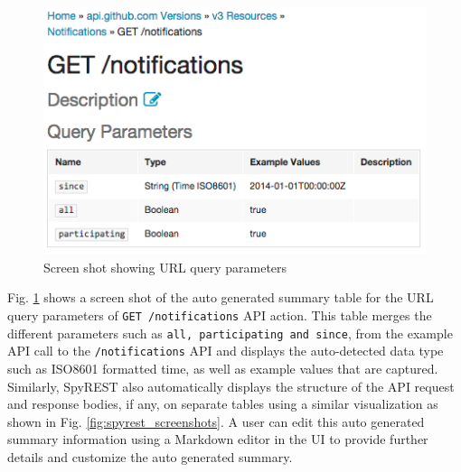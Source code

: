 \documentclass[conference]{IEEEtran}
\begin{document}
\begin{figure}[!tbh]
  \centering
  \includegraphics[width=\linewidth]{notifications_query.png}
  \caption{Screen shot showing URL query parameters}
  \label{fig:notifications_query}
\end{figure}

Fig. \ref{fig:notifications_query} shows a screen shot of the auto generated summary table for the URL query parameters of \texttt{GET /notifications} API action. This table merges the different parameters such as \texttt{all, participating and since}, from the example API call to the \texttt{/notifications} API and displays the auto-detected data type such as ISO8601 formatted time, as well as example values that are captured. Similarly, SpyREST also automatically displays the structure of the API request and response bodies, if any, on separate tables using a similar visualization as shown in Fig. \ref{fig:spyrest_screenshots}. A user can edit this auto generated summary information using a Markdown editor in the UI to provide further details and customize the auto generated summary.
\end{document}
